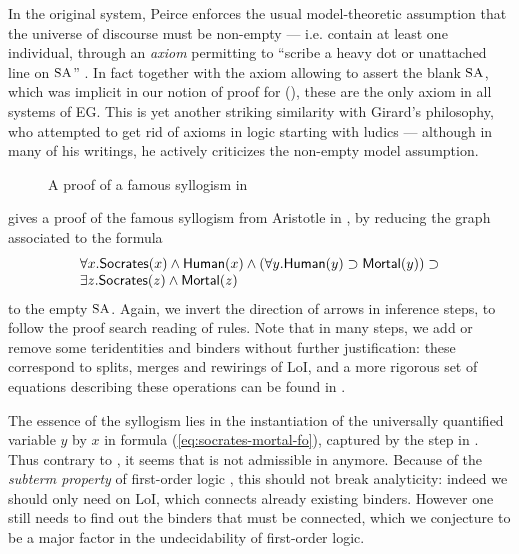 \begin{remark}
In the original  system, Peirce enforces the usual model-theoretic
assumption that the universe of discourse must be non-empty --- i.e. contain at
least one individual, through an \emph{axiom} permitting to ``scribe a heavy dot
or unattached line on $\small\textsc{SA}$'' \cite[p.~47]{Roberts+1973}. In fact together with
the axiom allowing to assert the blank $\small\textsc{SA}$, which was implicit in our notion
of proof for  (), these are the only axiom in all
systems of EG. This is yet another striking similarity with Girard's philosophy,
who attempted to get rid of axioms in logic starting with ludics --- although in
many of his writings, he actively criticizes the non-empty model assumption.
\end{remark}

\begin{figure*}
  
  \caption{A proof of a famous syllogism in }
\end{figure*}

 gives a proof of the famous syllogism from Aristotle
in , by reducing the graph associated to the formula
\begin{equation}
  \begin{array}{l}
    \forall x. \mbox{\textsf{Socrates}}(x) \land \mbox{\textsf{Human}}(x) \land (\forall y. \mbox{\textsf{Human}}(y) \supset \mbox{\textsf{Mortal}}(y)) \supset \\
    \exists z. \mbox{\textsf{Socrates}}(z) \land \mbox{\textsf{Mortal}}(z) \label{eq:socrates-mortal-fo}
  \end{array}
\end{equation}
to the empty $\small\textsc{SA}$. Again, we invert the direction of arrows in inference steps,
to follow the proof search reading of rules. Note that in many steps, we add or
remove some teridentities and binders without further justification: these
correspond to splits, merges and rewirings of LoI, and a more rigorous set of
equations describing these operations can be found in \cite[Section 3: ``The
algebra of lines of identity'']{pietarinen_compositional_2020}.

The essence of the syllogism lies in the instantiation of the universally
quantified variable $y$ by $x$ in formula (\ref{eq:socrates-mortal-fo}),
captured by the  step in . Thus
contrary to , it seems that  is not admissible in
 anymore. Because of the \emph{subterm property} of first-order logic
, this should not break analyticity:
indeed we should only need  on LoI, which connects already
existing binders. However one still needs to find out the binders that must be
connected, which we conjecture to be a major factor in the undecidability of
first-order logic.

